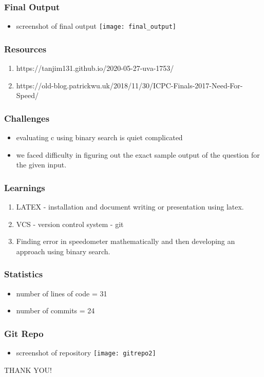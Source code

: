 \documentclass{beamer}
\begin{document}
    \begin{frame}
            \frametitle{Final Output}
            \begin{itemize}
                \item screenshot of final output
                        \texttt{[image: final\_output]}
            \end{itemize}
    \end{frame}

    \begin{frame}
            \frametitle{Resources}
            \begin{enumerate}
	    	\item https://tanjim131.github.io/2020-05-27-uva-1753/
	    	\item https://old-blog.patrickwu.uk/2018/11/30/ICPC-Finals-2017-Need-For-Speed/
            \end{enumerate}
    \end{frame}

    \begin{frame}
            \frametitle{Challenges}
            \begin{itemize}
            	    \item evaluating c using binary search is quiet complicated 
	    	    \item we faced difficulty in figuring out the exact sample output of the question for the given input.
            \end{itemize}
    \end{frame}

    \begin{frame}
            \frametitle{Learnings}
            \begin{enumerate}
                \item LATEX - installation and document writing or presentation using latex.
		\item VCS - version control system - git
		\item Finding error in speedometer mathematically and then developing an approach using binary search.
            \end{enumerate}
    \end{frame}

    \begin{frame}
            \frametitle{Statistics}
            \begin{itemize}
                \item number of lines of code = 31
                \item number of commits = 24
            \end{itemize}
    \end{frame}

    \begin{frame}
            \frametitle{Git Repo}
            \begin{itemize}
                \item screenshot of repository
			\texttt{[image: gitrepo2]}
	    \end{itemize}
    \end{frame}

    \begin{frame}
	    \begin{center}
		    \Huge THANK YOU!
	    \end{center}
    \end{frame}
\end{document}
